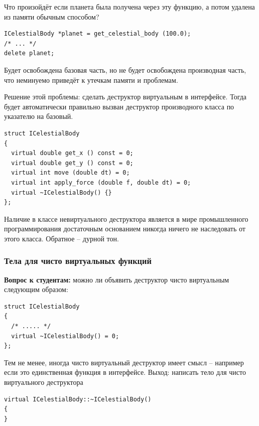 \documentclass[a4paper,12pt,oneside]{article}
\newif\ifanswers
\begin{document}
Что произойдёт если планета была получена через эту функцию, а потом удалена из памяти обычным способом?

\begin{lstlisting}
ICelestialBody *planet = get_celestial_body (100.0);
/* ... */
delete planet;
\end{lstlisting}

Будет освобождена базовая часть, но не будет освобождена производная часть, что неминуемо приведёт к утечкам памяти и проблемам. 

Решение этой проблемы: сделать деструктор виртуальным в интерфейсе. Тогда будет автоматически правильно вызван деструктор производного класса по указателю на базовый.

\begin{lstlisting}
struct ICelestialBody
{
  virtual double get_x () const = 0;
  virtual double get_y () const = 0;
  virtual int move (double dt) = 0;
  virtual int apply_force (double f, double dt) = 0;
  virtual ~ICelestialBody() {}
};
\end{lstlisting}

Наличие в классе невиртуального деструктора является в мире промышленного программирования достаточным основанием никогда ничего не наследовать от этого класса. Обратное – дурной тон. 

\subsubsection{Тела для чисто виртуальных функций}\label{VirtdestrBody}

\textbf{Вопрос к студентам:} можно ли объявить деструктор чисто виртуальным следующим образом:

\begin{lstlisting}
struct ICelestialBody
{
  /* ..... */
  virtual ~ICelestialBody() = 0;
};
\end{lstlisting}

\ifanswers
Правильный ответ: да, можно, но это приведет к pure virtual function call при попытке унчитожить любого наследника такого класса.
\fi

Тем не менее, иногда чисто виртуальный деструктор имеет смысл -- например если это единственная функция в интерфейсе. Выход: написать тело для чисто виртуального деструктора

\begin{lstlisting}
virtual ICelestialBody::~ICelestialBody()
{
}
\end{lstlisting}
\end{document}
